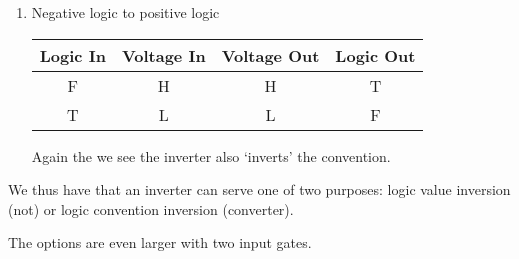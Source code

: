\begin{example}
\begin{enumerate}
\item Negative logic to positive logic

\begin{tabular}{cc||cc}
Logic In & Voltage In & Voltage Out & Logic Out \\\hline
F        & H          & H           & T         \\
T        & L          & L           & F         \\
\end{tabular}

Again the we see the inverter also `inverts' the convention.
\end{enumerate}
We thus have that an inverter can serve one of two purposes: logic value inversion (not) or logic convention inversion (converter).
\end{example}

The options are even larger with two input gates.

